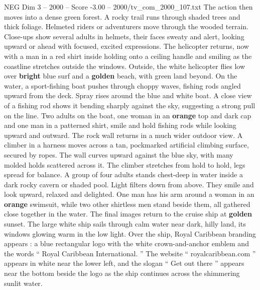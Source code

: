 \begin{textsample}{NEG Dim 3 – 2000 – Score -3.00 – 2000/tv\_com\_2000\_107.txt}
The action then moves into a dense green forest.
A rocky trail runs through shaded trees and thick foliage.
Helmeted riders or adventurers move through the wooded terrain.
Close-ups show several adults in helmets, their faces sweaty and alert, looking upward or ahead with focused, excited expressions.
The helicopter returns, now with a man in a red shirt inside holding onto a ceiling handle and smiling as the coastline stretches outside the windows.
Outside, the white helicopter flies low over \textbf{bright} blue surf and a \textbf{golden} beach, with green land beyond.
On the water, a sport-fishing boat pushes through choppy waves, fishing rods angled upward from the deck.
Spray rises around the blue and white boat.
A close view of a fishing rod shows it bending sharply against the sky, suggesting a strong pull on the line.
Two adults on the boat, one woman in an \textbf{orange} top and dark cap and one man in a patterned shirt, smile and hold fishing rods while looking upward and outward.
The rock wall returns in a much wider outdoor view.
A climber in a harness moves across a tan, pockmarked artificial climbing surface, secured by ropes.
The wall curves upward against the blue sky, with many molded holds scattered across it.
The climber stretches from hold to hold, legs spread for balance.
A group of four adults stands chest-deep in water inside a dark rocky cavern or shaded pool.
Light filters down from above.
They smile and look upward, relaxed and delighted.
One man has his arm around a woman in an \textbf{orange} swimsuit, while two other shirtless men stand beside them, all gathered close together in the water.
The final images return to the cruise ship at \textbf{golden} sunset.
The large white ship sails through calm water near dark, hilly land, its windows glowing warm in the low light.
Over the ship, Royal Caribbean branding appears : a blue rectangular logo with the white crown-and-anchor emblem and the words “ Royal Caribbean International. ” The website “ royalcaribbean.com ” appears in white near the lower left, and the slogan “ Get out there ” appears near the bottom beside the logo as the ship continues across the shimmering sunlit water.

\end{textsample}
